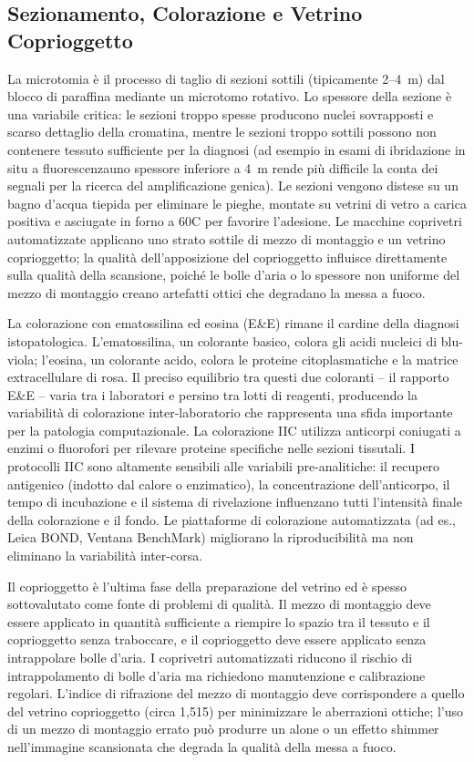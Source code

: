\subsection{Sezionamento, Colorazione e Vetrino Coprioggetto}

La microtomia è il processo di taglio di sezioni sottili (tipicamente 2--4~\textmu m) dal blocco
di paraffina mediante un microtomo rotativo. Lo spessore della sezione è una variabile critica:
le sezioni troppo spesse producono nuclei sovrapposti e scarso dettaglio della cromatina, mentre
le sezioni troppo sottili possono non contenere tessuto sufficiente per la diagnosi (ad esempio in esami 
di ibridazione in situ a fluorescenzauno spessore inferiore a 4~\textmu m rende più difficile 
la conta dei segnali per la ricerca del amplificazione genica). Le sezioni
vengono distese su un bagno d'acqua tiepida per eliminare le pieghe, montate su vetrini di vetro
a carica positiva e asciugate in forno a 60\textdegree C per favorire l'adesione. Le macchine
coprivetri automatizzate applicano uno strato sottile di mezzo di montaggio e un vetrino
coprioggetto; la qualità dell'apposizione del coprioggetto influisce direttamente sulla qualità della scansione,
poiché le bolle d'aria o lo spessore non uniforme del mezzo di montaggio creano artefatti ottici
che degradano la messa a fuoco.

La colorazione con ematossilina ed eosina (E\&E) rimane il cardine della diagnosi istopatologica.
L'ematossilina, un colorante basico, colora gli acidi nucleici di blu-viola; l'eosina, un
colorante acido, colora le proteine citoplasmatiche e la matrice extracellulare di rosa. Il
preciso equilibrio tra questi due coloranti -- il rapporto E\&E -- varia tra i laboratori e
persino tra lotti di reagenti, producendo la variabilità di colorazione inter-laboratorio che
rappresenta una sfida importante per la patologia computazionale. La colorazione IIC utilizza
anticorpi coniugati a enzimi o fluorofori per rilevare proteine specifiche nelle sezioni tissutali.
I protocolli IIC sono altamente sensibili alle variabili pre-analitiche: il recupero antigenico
(indotto dal calore o enzimatico), la concentrazione dell'anticorpo, il tempo di incubazione e il
sistema di rivelazione influenzano tutti l'intensità finale della colorazione e il fondo. Le
piattaforme di colorazione automatizzata (ad es., Leica BOND, Ventana BenchMark) migliorano la
riproducibilità ma non eliminano la variabilità inter-corsa.

Il coprioggetto è l'ultima fase della preparazione del vetrino ed è spesso sottovalutato come
fonte di problemi di qualità. Il mezzo di montaggio deve essere applicato in quantità sufficiente
a riempire lo spazio tra il tessuto e il coprioggetto senza traboccare, e il coprioggetto deve
essere applicato senza intrappolare bolle d'aria. I coprivetri automatizzati riducono il rischio
di intrappolamento di bolle d'aria ma richiedono manutenzione e calibrazione regolari. L'indice
di rifrazione del mezzo di montaggio deve corrispondere a quello del vetrino coprioggetto
(circa 1,515) per minimizzare le aberrazioni ottiche; l'uso di un mezzo di montaggio errato può
produrre un alone o un effetto shimmer nell'immagine scansionata che degrada la qualità della
messa a fuoco.

